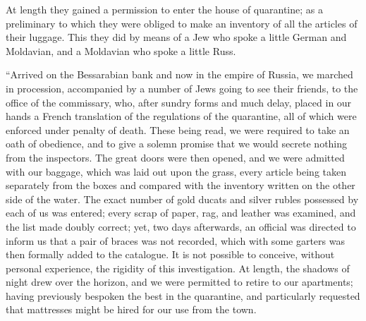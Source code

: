 At length
they gained a permission to enter the house of quarantine; as a
preliminary to which they were obliged to make an inventory of all the
articles of their luggage. This they did by means of a Jew who spoke a
little German and Moldavian, and a Moldavian who spoke a little Russ.

``Arrived
on the Bessarabian bank and now in the empire of Russia, we marched in
procession, accompanied by a number of Jews going to see their friends,
to the office of the commissary, who, after sundry forms and much delay,
placed in our hands a French translation of the regulations of the
quarantine, all of which were enforced under penalty of death. These
being read, we were required to take an oath of obedience, and to give a
solemn promise that we would secrete nothing from the inspectors. The
great doors were then opened, and we were admitted with our baggage,
which was laid out upon the grass, every article being taken separately
from the boxes and compared with the inventory written on the other side
of the water. The exact number of gold ducats and silver rubles
possessed by each of us was entered; every scrap of paper, rag, and
leather was examined, and the list made doubly correct; yet, two days
afterwards, an official was directed to inform us that a pair of braces
was not recorded, which with some garters was then formally added to the
catalogue. It is not possible to conceive, without personal experience,
the rigidity of this investigation. At length, the shadows of night drew
over the horizon, and we were permitted to retire to our apartments;
having previously bespoken the best in the quarantine, and particularly
requested that mattresses might be hired for our use from the town.

